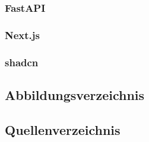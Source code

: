 \subsubsection{FastAPI}

\subsubsection{Next.js}

\subsubsection{shadcn}

\subsection{Abbildungsverzeichnis}
\listoffigures

\subsection{Quellenverzeichnis}
% 
% 